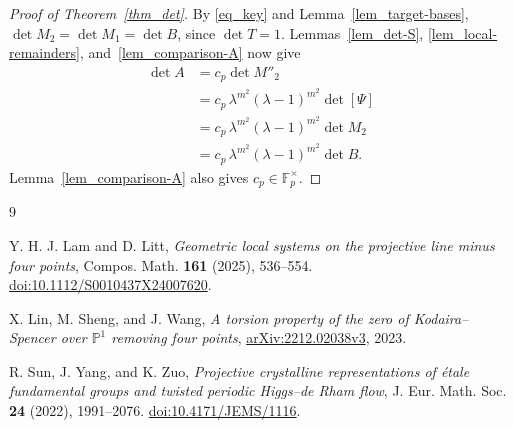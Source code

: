 \documentclass{amsart}
\numberwithin{equation}{section}
\begin{document}
\begin{proof}[Proof of Theorem~\ref{thm_det}]
By \eqref{eq_key} and Lemma~\ref{lem_target-bases},
$\det M_2= \det M_1=\det B$, since $\det T=1$.
Lemmas~\ref{lem_det-S}, \ref{lem_local-remainders},
and~\ref{lem_comparison-A} now give
\begin{align*}
  \det A
    &=c_p\det M''_2\\
    &=c_p\,\lambda^{m^2}(\lambda-1)^{m^2}\det[\Psi]\\
    &=c_p\,\lambda^{m^2}(\lambda-1)^{m^2}\det M_2\\
    &=c_p\,\lambda^{m^2}(\lambda-1)^{m^2}\det B.
\end{align*}
Lemma~\ref{lem_comparison-A} also gives
$c_p\in\mathbb F_p^\times$.
\end{proof}







\begin{thebibliography}{9}

Y. H. J. Lam and D. Litt,
\emph{Geometric local systems on the projective line minus four points},
Compos. Math. \textbf{161} (2025), 536--554.
\href{https://doi.org/10.1112/S0010437X24007620}{doi:10.1112/S0010437X24007620}.

X. Lin, M. Sheng, and J. Wang,
\emph{A torsion property of the zero of Kodaira--Spencer over
$\mathbb P^1$ removing four points},
\href{https://arxiv.org/abs/2212.02038v3}{arXiv:2212.02038v3}, 2023.

R. Sun, J. Yang, and K. Zuo,
\emph{Projective crystalline representations of \'{e}tale fundamental
groups and twisted periodic Higgs--de Rham flow},
J. Eur. Math. Soc. \textbf{24} (2022), 1991--2076.
\href{https://doi.org/10.4171/JEMS/1116}{doi:10.4171/JEMS/1116}.

\end{thebibliography}
\end{document}

